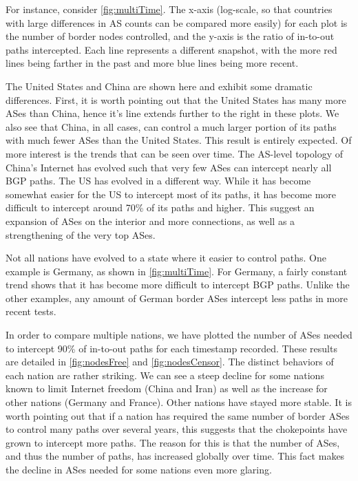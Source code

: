 \documentclass[10pt, conference, letterpaper]{IEEEtran}
\begin{document}
\par
For instance, consider \figurename \ref{fig:multiTime}. 
The x-axis (log-scale, so that countries with large differences in AS counts can be compared more easily) for each plot
is the number of border nodes controlled, and the y-axis is the ratio of in-to-out paths intercepted. Each line represents a different snapshot, with the more red lines being
farther in the past and more blue lines being more recent.

\par
The United States and China are shown here and exhibit some dramatic differences. First, it is worth pointing out that the United States has many more ASes than China, hence
it's line extends further to the right in these plots. We also see that China, in all cases, can control a much larger portion of its paths with much fewer ASes than the
United States. This result is entirely expected. Of more interest is the trends that can be seen over time. The AS-level topology of China's Internet has evolved such that very few
ASes can intercept nearly all BGP paths. The US has evolved in a different way. While it has become somewhat easier for the US to intercept most of its paths, it has become
more difficult to intercept around 70\% of its paths and higher. This suggest an expansion of ASes on the interior and more connections, as well as a strengthening of
the very top ASes.

\par
Not all nations have evolved to a state where it easier to control paths. One example is Germany, as shown in \figurename \ref{fig:multiTime}. For Germany, a fairly constant
trend shows that it has become more difficult to intercept BGP paths. Unlike the other examples, any amount of German border ASes intercept less paths in more recent tests.

\par
In order to compare multiple nations, we have plotted the number of ASes needed to intercept 90\% of in-to-out paths
for each timestamp recorded. These results are detailed in \figurename \ref{fig:nodesFree} and \figurename \ref{fig:nodesCensor}.
The distinct behaviors of each nation are rather striking. We can see a steep decline for some
nations known to limit Internet freedom (China and Iran) as well as the increase for other nations
(Germany and France). Other nations have stayed more stable. It is worth pointing out that if a nation
has required the same number of border ASes to control many paths over several years, this suggests
that the chokepoints have grown to intercept more paths. The reason for this is that the number of ASes,
and thus the number of paths, has increased globally over time. This fact makes the decline in ASes
needed for some nations even more glaring.
\end{document}
